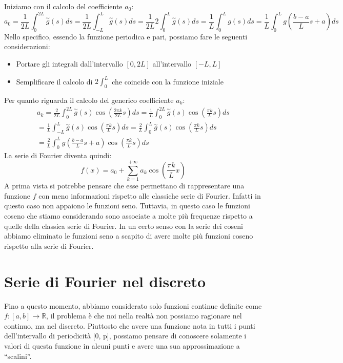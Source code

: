 Iniziamo con il calcolo del coefficiente $a_0$:
\begin{equation}
    a_0 = \frac{1}{2L} \int_{0}^{2L} \stackrel{\sim}{g}(s)ds = \frac{1}{2L}
    \int_{-L}^{L} \stackrel{\sim}{g}(s)ds = \frac{1}{2L} 2 \int_{0}^{L} \stackrel{\sim}{g}(s)ds
    = \frac{1}{L} \int_{0}^{L} g(s)ds = \frac{1}{L} \int_{0}^{L} g\left(\frac{b - a}{L} s + a\right)ds
\end{equation}
Nello specifico, essendo la funzione periodica e pari, possiamo fare le seguenti
considerazioni:
\begin{itemize}
    \item Portare gli integrali dall'intervallo $[0,2L]$ all'intervallo $[-L,L]$
    \item Semplificare il calcolo di $2\int_{0}^{L}$ che coincide con la funzione iniziale
\end{itemize}
Per quanto riguarda il calcolo del generico coefficiente $a_k$:
\begin{equation}
    \begin{array}{l}
        a_k = \frac{2}{2L} \int_{0}^{2L} \stackrel{\sim}{g}(s) \cos\left(\frac{2\pi k}{2L}s\right)ds
        = \frac{1}{L} \int_{0}^{2L} \stackrel{\sim}{g}(s) \cos\left(\frac{\pi k}{L}s\right)ds \\
        = \frac{1}{L} \int_{-L}^{L} \stackrel{\sim}{g}(s) \cos\left(\frac{\pi k}{L}s\right)ds
        = \frac{2}{L} \int_{0}^{L} \stackrel{\sim}{g}(s) \cos\left(\frac{\pi k}{L}s\right)ds  \\
        = \frac{2}{L} \int_{0}^{L} g\left(\frac{b - a}{L} s  + a\right) \cos\left(\frac{\pi k}{L}s\right)ds
    \end{array}
\end{equation}
La serie di Fourier diventa quindi:
\begin{equation}
    f(x) = a_0 + \sum_{k=1}^{+\infty} a_k \cos\left(\frac{\pi k}{L}x\right)
\end{equation}
A prima vista si potrebbe pensare che esse permettano di rappresentare una
funzione $f$ con meno informazioni rispetto alle classiche serie di Fourier.
Infatti in questo caso non appaiono le funzioni seno. Tuttavia, in questo caso le
funzioni coseno che stiamo considerando sono associate a molte più frequenze
rispetto a quelle della classica serie di Fourier. In un certo senso con la serie
dei coseni abbiamo eliminato le funzioni seno a scapito di avere molte più funzioni
coseno rispetto alla serie di Fourier.
\section{Serie di Fourier nel discreto}
Fino a questo momento, abbiamo considerato solo funzioni continue definite come
$f:[a,b]\to \mathbb{R}$, il problema è che noi nella realtà non possiamo ragionare
nel continuo, ma nel discreto. Piuttosto che avere una funzione nota in tutti i
punti dell'intervallo di periodicità [0, p], possiamo pensare di conoscere solamente
i valori di questa funzione in alcuni punti e avere una sua approssimazione a “scalini”.

